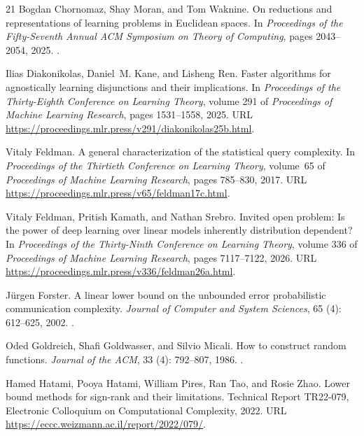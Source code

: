 \documentclass[11pt,letterpaper,pmlr,twoside]{jmlr}
\begin{document}
\begin{thebibliography}{21}
Bogdan Chornomaz, Shay Moran, and Tom Waknine.
\newblock On reductions and representations of learning problems in {Euclidean}
  spaces.
\newblock In \emph{Proceedings of the Fifty-Seventh Annual ACM Symposium on
  Theory of Computing}, pages 2043--2054, 2025.
\newblock {}.

Ilias Diakonikolas, Daniel~M. Kane, and Lisheng Ren.
\newblock Faster algorithms for agnostically learning disjunctions and their
  implications.
\newblock In \emph{Proceedings of the Thirty-Eighth Conference on Learning
  Theory}, volume 291 of \emph{Proceedings of Machine Learning Research}, pages
  1531--1558, 2025.
\newblock URL \url{https://proceedings.mlr.press/v291/diakonikolas25b.html}.

Vitaly Feldman.
\newblock A general characterization of the statistical query complexity.
\newblock In \emph{Proceedings of the Thirtieth Conference on Learning Theory},
  volume~65 of \emph{Proceedings of Machine Learning Research}, pages 785--830,
  2017.
\newblock URL \url{https://proceedings.mlr.press/v65/feldman17c.html}.

Vitaly Feldman, Pritish Kamath, and Nathan Srebro.
\newblock Invited open problem: Is the power of deep learning over linear
  models inherently distribution dependent?
\newblock In \emph{Proceedings of the Thirty-Ninth Conference on Learning
  Theory}, volume 336 of \emph{Proceedings of Machine Learning Research}, pages
  7117--7122, 2026.
\newblock URL \url{https://proceedings.mlr.press/v336/feldman26a.html}.

J{\"u}rgen Forster.
\newblock A linear lower bound on the unbounded error probabilistic
  communication complexity.
\newblock \emph{Journal of Computer and System Sciences}, 65
  (4): 612--625, 2002.
\newblock {}.

Oded Goldreich, Shafi Goldwasser, and Silvio Micali.
\newblock How to construct random functions.
\newblock \emph{Journal of the ACM}, 33 (4): 792--807, 1986.
\newblock {}.

Hamed Hatami, Pooya Hatami, William Pires, Ran Tao, and Rosie Zhao.
\newblock Lower bound methods for sign-rank and their limitations.
\newblock Technical Report TR22-079, Electronic Colloquium on Computational
  Complexity, 2022.
\newblock URL \url{https://eccc.weizmann.ac.il/report/2022/079/}.


\end{thebibliography}
\end{document}
